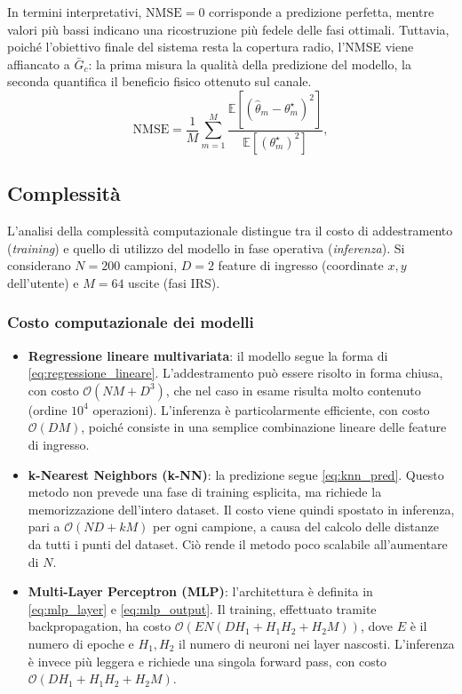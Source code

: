 \documentclass[12pt,a4paper]{report}
\begin{document}
In termini interpretativi, $\text{NMSE}=0$ corrisponde a predizione
perfetta, mentre valori pi\`u bassi indicano una ricostruzione pi\`u
fedele delle fasi ottimali. Tuttavia, poich\'e l'obiettivo finale del
sistema resta la copertura radio, l'NMSE viene affiancato a
$\bar{G}_c$: la prima misura la qualit\`a della predizione del
modello, la seconda quantifica il beneficio fisico ottenuto sul canale.
\begin{equation}
  \text{NMSE} = \frac{1}{M} \sum_{m=1}^M
  \frac{\mathbb{E}[(\hat{\theta}_m -
  \theta_m^\star)^2]}{\mathbb{E}[(\theta_m^\star)^2]},
  \label{eq:nmse}
\end{equation}

\subsection{Complessità}
L'analisi della complessità computazionale distingue tra il costo di
addestramento (\emph{training}) e quello di utilizzo del modello in
fase operativa (\emph{inferenza}). Si considerano $N=200$ campioni,
$D=2$ feature di ingresso (coordinate $x,y$ dell'utente) e $M=64$
uscite (fasi IRS).

\subsubsection{Costo computazionale dei modelli}

\begin{itemize}
  \item \textbf{Regressione lineare multivariata}: il modello segue
    la forma di \eqref{eq:regressione_lineare}. L'addestramento può
    essere risolto in forma chiusa, con costo $\mathcal{O}(NM +
    D^3)$, che nel caso in esame risulta molto contenuto (ordine
    $10^4$ operazioni). L'inferenza è particolarmente efficiente, con
    costo $\mathcal{O}(DM)$, poiché consiste in una semplice
    combinazione lineare delle feature di ingresso.

  \item \textbf{k-Nearest Neighbors (k-NN)}: la predizione segue
    \eqref{eq:knn_pred}. Questo metodo non prevede una fase di
    training esplicita, ma richiede la memorizzazione dell'intero
    dataset. Il costo viene quindi spostato in inferenza, pari a
    $\mathcal{O}(ND + kM)$ per ogni campione, a causa del calcolo
    delle distanze da tutti i punti del dataset. Ciò rende il metodo
    poco scalabile all'aumentare di $N$.

  \item \textbf{Multi-Layer Perceptron (MLP)}: l'architettura è
    definita in \eqref{eq:mlp_layer} e \eqref{eq:mlp_output}. Il
    training, effettuato tramite backpropagation, ha costo
    $\mathcal{O}\!\left(E N (D H_1 + H_1 H_2 + H_2 M)\right)$, dove
    $E$ è il numero di epoche e $H_1, H_2$ il numero di neuroni nei
    layer nascosti. L'inferenza è invece più leggera e richiede una
    singola forward pass, con costo $\mathcal{O}(D H_1 + H_1 H_2 + H_2 M)$.
\end{itemize}
\end{document}
